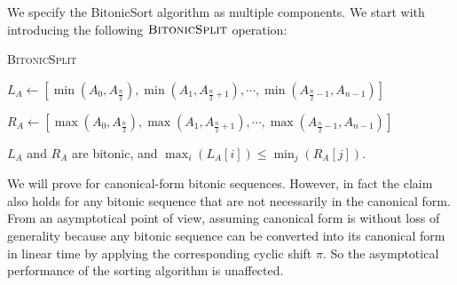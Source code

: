 We specify the BitonicSort algorithm as multiple components. We start with introducing the following $\textsc{BitonicSplit}$ operation:

\begin{algorithm}[h]
 \caption{\textsc{BitonicSplit}}


$L_A \gets [\min(A_0, A_{\frac{n}{2}}), \min(A_1, A_{\frac{n}{2}+1}), \cdots, \min(A_{\frac{n}{2}-1}, A_{n-1})]$\;

$R_A \gets [\max(A_0, A_{\frac{n}{2}}), \max(A_1, A_{\frac{n}{2}+1}), \cdots, \max(A_{\frac{n}{2}-1}, A_{n-1})]$\;

\;

\end{algorithm}

\begin{claim}\label{clm1}
    $L_A$ and $R_A$ are bitonic, and $\max_i (L_A[i]) \leq \min_j (R_A[j])$.
\end{claim}

\begin{remark}
We will prove  
for canonical-form bitonic sequences. 
However, in fact the claim also holds for any bitonic sequence
that are not necessarily in the canonical form.
From an asymptotical point of view, assuming
canonical form is without loss of generality because any bitonic sequence can be converted into its canonical form in linear time by applying the corresponding cyclic shift $\pi$. 
So the asymptotical performance of the sorting algorithm is unaffected.
\end{remark}



